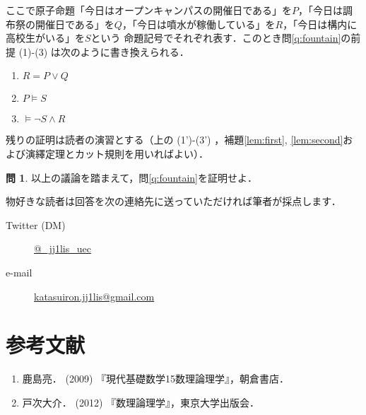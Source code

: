 \documentclass[uplatex,a4paper,dvipdfmx]{jsarticle}
\theoremstyle{definition}
\newtheorem{question}{問}
\begin{document}
                ここで原子命題「今日はオープンキャンパスの開催日である」を$P$，「今日は調布祭の開催日である」を$Q$，「今日は噴水が稼働している」を$R$，「今日は構内に高校生がいる」を$S$という
                命題記号でそれぞれ表す．このとき問\ref{q:fountain}の前提 (1)-(3) は次のように書き換えられる．
                \begin{enumerate}[(1')]
                    \item $R = P \lor Q$
                    \item $P \vDash S$
                    \item $\vDash \lnot S \land R$
                \end{enumerate}

                残りの証明は読者の演習とする（上の (1')-(3') ，補題\ref{lem:first}, \ref{lem:second}および演繹定理とカット規則を用いればよい）．
                \vspace{2ex}
                \begin{shadebox}
                \vspace{1ex}
                \begin{question}
                    以上の議論を踏まえて，問\ref{q:fountain}を証明せよ．

                    物好きな読者は回答を次の連絡先に送っていただければ筆者が採点します．
                    \begin{description}
                        \item[Twitter (DM)] \url{@_jj1lis_uec}
                        \item[e-mail] \url{katasuiron.jj1lis@gmail.com}
                    \end{description}
                \end{question}
                \vspace{1ex}
                \end{shadebox}
                \vspace{2ex}

    \section{参考文献}
        \begin{enumerate}[1. ]
            \item 鹿島亮． (2009) 『現代基礎数学15\quad  数理論理学』，朝倉書店．
            \item 戸次大介． (2012) 『数理論理学』，東京大学出版会．
        \end{enumerate}
\end{document}
